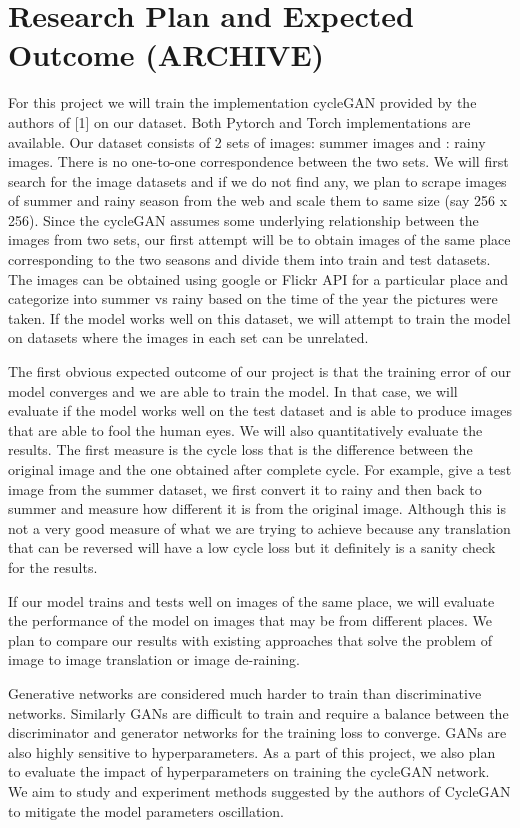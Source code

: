 \documentclass{article}
\begin{document}
\section{Research Plan and Expected Outcome (ARCHIVE)}
\label{headings}

For this project we will train the implementation cycleGAN provided by the 
authors of [1] on our dataset. Both Pytorch and Torch implementations are 
available. Our dataset consists of 2 sets of images: summer images and :
rainy images. There is no one-to-one correspondence between the two sets. 
We will first search for the image datasets and if we do not find any, we 
plan to scrape images of summer and rainy season from the web and scale 
them to same size (say 256 x 256). Since the cycleGAN assumes some 
underlying relationship between the images from two sets, our first 
attempt will be to obtain images of the same place corresponding to the 
two seasons and divide them into train and test datasets. The images can
be obtained using google or Flickr API for a particular place and 
categorize into summer vs rainy based on the time of the year the 
pictures were taken. If the model works well on this dataset, we will 
attempt to train the model on datasets where the images in each set can 
be unrelated.

The first obvious expected outcome of our project is that the training 
error of our model converges and we are able to train the model. In that 
case, we will evaluate if the model works well on the test dataset and is 
able to produce images that are able to fool the human eyes. We will also 
quantitatively evaluate the results. The first measure is the cycle loss 
that is the difference between the original image and the one obtained 
after complete cycle. For example, give a test image from the summer 
dataset, we first convert it to rainy and then back to summer and measure 
how different it is from the original image. Although this is not a very 
good measure of what we are trying to achieve because any translation that 
can be reversed will have a low cycle loss but it definitely is a sanity 
check for the results.

If our model trains and tests well on images of the same place, we will 
evaluate the performance of the model on images that may be from different 
places. We plan to compare our results with existing approaches that solve 
the problem of image to image translation or image de-raining.

Generative networks are considered much harder to train than discriminative 
networks. Similarly GANs are difficult to train and require a balance 
between the discriminator and generator networks for the training loss 
to converge. GANs are also highly sensitive to hyperparameters. 
As a part of this project, we also plan to evaluate the impact of 
hyperparameters on training the cycleGAN network. We aim to study and 
experiment methods suggested by the authors of CycleGAN to mitigate the 
model parameters oscillation.
\end{document}
